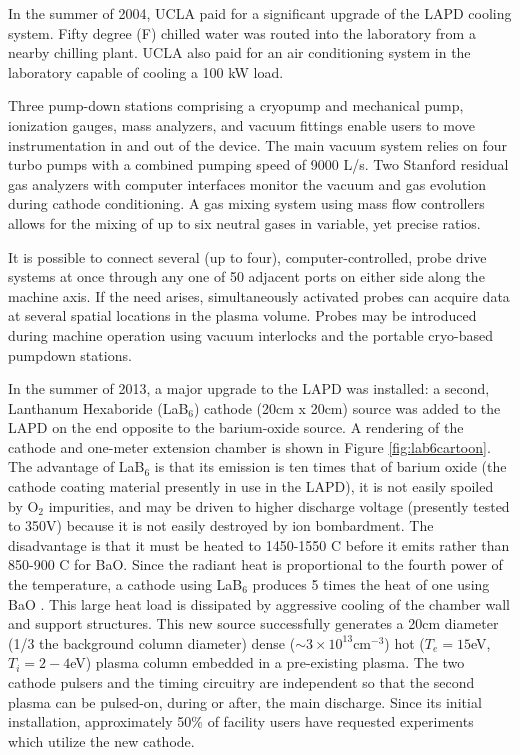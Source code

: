 \documentclass[11pt]{article}
\begin{document}
	In the summer of 2004, UCLA paid for a significant upgrade of the LAPD cooling system.  Fifty degree (F) chilled water was routed into the laboratory from a nearby chilling plant.  UCLA also paid for an air conditioning system in the laboratory capable of cooling a 100 kW load. 

Three pump-down stations comprising a cryopump and mechanical pump, ionization gauges, mass analyzers, and vacuum fittings enable users to move instrumentation in and out of the device.  The main vacuum system relies on four turbo pumps with a combined pumping speed of 9000 L/s.  Two Stanford residual gas analyzers with computer interfaces monitor the vacuum and gas evolution during cathode conditioning.   A gas mixing system using mass flow controllers allows for the mixing of up to six neutral gases in variable, yet precise ratios.

		It is possible to connect several (up to four), computer-controlled, probe drive systems at once through any one of 50 adjacent ports on either side along the machine axis.  If the need arises, simultaneously activated probes can acquire data at several spatial locations in the plasma volume.  Probes may be introduced during machine operation using vacuum interlocks and the portable cryo-based pumpdown stations. 
		
		
		In the summer of 2013, a major upgrade to the LAPD was installed: a second, Lanthanum Hexaboride (LaB$_{6}$) cathode (20cm x 20cm)  source was added to the LAPD on the end opposite to the barium-oxide source. A rendering of the cathode and one-meter extension chamber is shown in Figure \ref{fig:lab6cartoon}. The advantage of LaB$_{6}$ is that its emission is ten times that of barium oxide (the cathode coating material presently in use in the LAPD), it is not easily spoiled by O$_{2}$ impurities, and may be driven to higher discharge voltage (presently tested to 350V) because it is not easily destroyed by ion bombardment.  The disadvantage is that it must be heated to 1450-1550 C before it emits rather than 850-900 C for BaO.  Since the radiant heat is proportional to the fourth power of the temperature, a cathode using LaB$_{6}$ produces 5 times the heat of one using BaO .  This large heat load is dissipated by aggressive cooling of the chamber wall and support structures.   This new source successfully generates a 20cm diameter (1/3 the background column diameter) dense ($\sim 3\times 10^{13}$cm$^{-3}$) hot ($T_{e}=15$eV, $T_{i}=2-4$eV) plasma column embedded in a pre-existing plasma.  The two cathode pulsers and the timing circuitry are independent so that the second plasma can be pulsed-on, during or after, the main discharge. Since its initial installation, approximately 50\% of facility users have requested experiments which utilize the new cathode.
\end{document}
